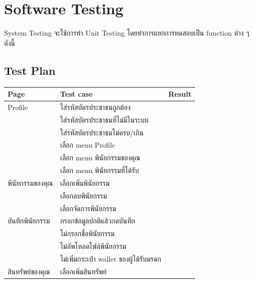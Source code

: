 \documentclass[12pt,oneside,openright,a4paper]{cpe-thai-project}
\begin{document}
\section{Software Testing}
\tab System Testing จะใช้การทำ Unit Testing โดยทำการแยกการทดสอบเป็น function ต่าง ๆ ดังนี้
\subsection {Test Plan}
\begin{table}[h]
\begin{tabular}{|l|l|l|}
\hline
Page                   & Test case                                        &  Result \\ \hline
Profile                & ใส่รหัสบัตรประชาชนถูกต้อง                        &        \\ \hline
                       & ใส่รหัสบัตรประชาชนที่ไม่มีในระบบ                 &        \\ \hline
                       & ใส่รหัสบัตรประชาชนไม่ครบ/เกิน                    &        \\ \hline
                       & เลือก menu Profile                            &        \\ \hline
                       & เลือก menu พินัยกรรมของคุณ                     &        \\ \hline
                       & เลือก menu พินัยกรรมที่ได้รับ                    &        \\ \hline
พินัยกรรมของคุณ        & เลือกเพิ่มพินัยกรรม                              &        \\ \hline
                       & เลือกลบพินัยกรรม                                 &        \\ \hline
                       & เลือกจัดการพินัยกรรม                           &        \\ \hline
บันทึกพินัยกรรม        & กรอกข้อมูลปกติแล้วกดบันทึก                      &        \\ \hline
                       & ไม่กรอกชื่อพินัยกรรม                             &        \\ \hline
                       & ไม่อัพโหลดไฟล์พินัยกรรม                        &        \\ \hline
                       & ไม่เพิ่มกระเป๋า wallet ของผู้ได้รับมรดก         &        \\ \hline                             
สินทรัพย์ของคุณ        & เลือกเพิ่มสินทรัพย์                              &        \\ \hline                

\end{tabular}
\end{table}
\end{document}
